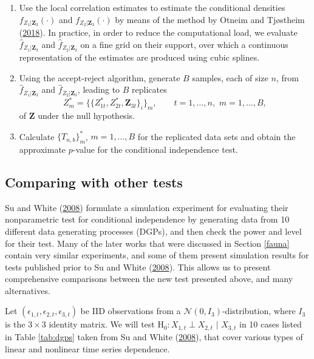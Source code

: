 \documentclass[
  12pt,
  letterpaper]{article}
\providecommand{\tightlist}{%
  \setlength{\itemsep}{0pt}\setlength{\parskip}{0pt}}
\newcommand{\Z}{\bm{Z}}
\theoremstyle{definition}
\theoremstyle{definition}
\theoremstyle{definition}
\theoremstyle{remark}
\begin{document}
\begin{enumerate}
\def\labelenumi{\arabic{enumi}.}
\tightlist
\item
  Use the local correlation estimates to estimate the conditional densities \(f_{Z_1|\Z_3}(\cdot)\) and \(f_{Z_2|\Z_3}(\cdot)\) by means of the method by Otneim and Tjøstheim (\protect\hyperlink{ref-otneim2017conditional}{2018}). In practice, in order to reduce the computational load, we evaluate \(\widehat f_{Z_1|\Z_3}\) and \(\widehat f_{Z_2|\Z_3}\) on a fine grid on their support, over which a continuous representation of the estimates are produced using cubic splines.
\item
  Using the accept-reject algorithm, generate \(B\) samples, each of size \(n\), from \(\widehat f_{Z_1|\Z_3}\) and \(\widehat f_{Z_2|\Z_3}\), leading to \(B\) replicates
  \[Z_m^* = \Big\{\{Z_{1t}^*, Z_{2t}^*, \Z_{3t}\}_i\Big\}_m, \qquad t = 1,\ldots,n, \,\, m = 1,\ldots,B,\]
  of \(\Z\) under the null hypothesis.
\item
  Calculate \(\{T_{n,b}\}_m^*\), \(m = 1,\ldots,B\) for the replicated data sets and obtain the approximate \(p\)-value for the conditional independence test.
\end{enumerate}

\hypertarget{chap:testexamples}{%
\subsection{Comparing with other tests}\label{chap:testexamples}}

Su and White (\protect\hyperlink{ref-su2008nonparametric}{2008}) formulate a simulation experiment for evaluating their nonparametric test for conditional independence by generating data from 10 different data generating processes (DGPs), and then check the power and level for their test. Many of the later works that were discussed in Section \ref{fauna} contain very similar experiments, and some of them present simulation results for tests published prior to Su and White (\protect\hyperlink{ref-su2008nonparametric}{2008}). This allows us to present comprehensive comparisons between the new test presented above, and many alternatives.

Let \((\epsilon_{1,t}, \epsilon_{2,t}, \epsilon_{3,t})\) be IID observations from a \(\mathcal{N}(0, I_3)\)-distribution, where \(I_3\) is the \(3\times3\) identity matrix. We will test H\(_0: X_{1,t} \perp X_{2,t} \,\,|\,\, X_{3,t}\) in 10 cases listed in Table \ref{tab:dgps} taken from Su and White (\protect\hyperlink{ref-su2008nonparametric}{2008}), that cover various types of linear and nonlinear time series dependence.
\end{document}
